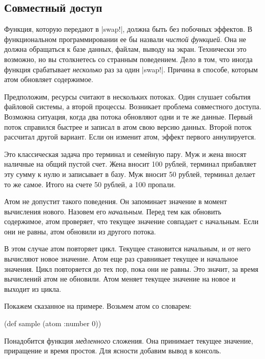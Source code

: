 \subsection{Совместный доступ}

Функция, которую передают в \spverb|swap!|, должна быть без побочных эффектов. В
функциональном программировании ее бы назвали \emph{чистой функцией}. Она не
должна обращаться к базе данных, файлам, выводу на экран. Технически это
возможно, но вы столкнетесь со странным поведением. Дело в том, что иногда
функция срабатывает \emph{несколько} раз за один \spverb|swap!|. Причина в
способе, которым атом обновляет содержимое.

Предположим, ресурсы считают в нескольких потоках. Один слушает события файловой
системы, а второй процессы. Возникает проблема совместного доступа. Возможна
ситуация, когда два потока обновляют одни и те же данные. Первый поток справился
быстрее и записал в атом свою версию данных. Второй поток рассчитал другой
вариант. Если он изменит атом, эффект первого аннулируется.

Это классическая задача про терминал и семейную пару. Муж и жена вносят наличные
на общий пустой счет. Жена вносит 100 рублей, терминал прибавляет эту сумму к
нулю и записывает в базу. Муж вносит 50 рублей, терминал делает то же
самое. Итого на счете 50 рублей, а 100 пропали.

Атом не допустит такого поведения. Он запоминает значение в момент вычисления
нового. Назовем его \emph{начальным}. Перед тем как обновить содержимое, атом
проверяет, что текущее значение совпадает с начальным. Если они не равны, атом
обновили из другого потока.

В этом случае атом повторяет цикл. Текущее становится начальным, и от него
вычисляют новое значение. Атом еще раз сравнивает текущее и начальное
значения. Цикл повторяется до тех пор, пока они не равны. Это значит, за время
вычислений атом не обновили. Атом меняет текущее значение на новое и выходит из
цикла.

Покажем сказанное на примере. Возьмем атом со словарем:

\begin{english}
  \begin{clojure}
(def sample (atom {:number 0}))
  \end{clojure}
\end{english}

Понадобится функция \emph{медленного} сложения. Она принимает текущее значение,
приращение и время простоя. Для ясности добавим вывод в консоль.

